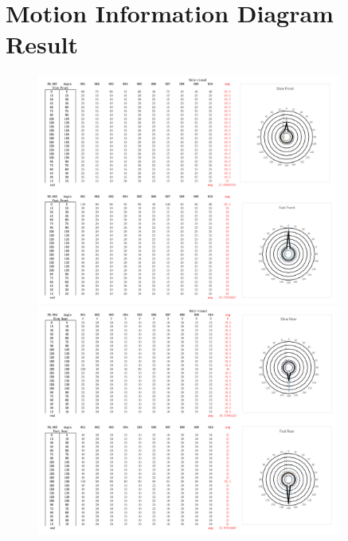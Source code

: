 \section{Motion Information Diagram Result}
\begin{figure}[h]
\centering
\includegraphics[width=0.9\textwidth,height=0.36\textheight]{A_thesis/appendix/Exp1_1-01.png}
\break
\break
\includegraphics[width=0.9\textwidth,height=0.36\textheight]{A_thesis/appendix/Exp1_1-02.png}
\end{figure}
\newpage


